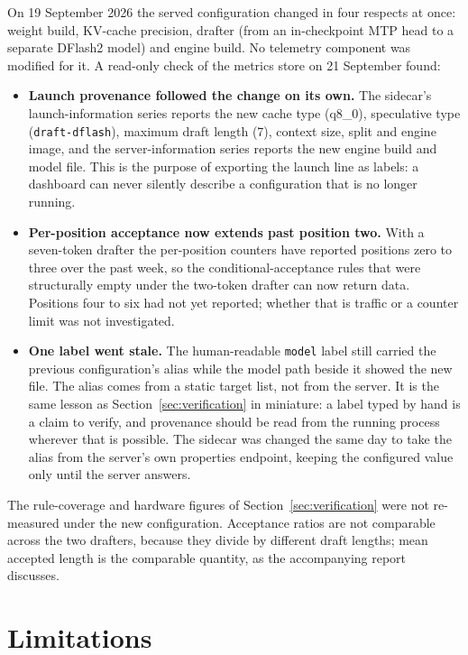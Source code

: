 \documentclass[11pt]{article}
\begin{document}
On 19 September 2026 the served configuration changed in four respects at once: weight build, KV-cache
precision, drafter (from an in-checkpoint MTP head to a separate DFlash2 model) and engine build. No
telemetry component was modified for it. A read-only check of the metrics store on 21 September found:
\begin{itemize}
\item \textbf{Launch provenance followed the change on its own.} The sidecar's launch-information
series reports the new cache type (q8\_0), speculative type (\texttt{draft-dflash}), maximum draft
length (7), context size, split and engine image, and the server-information series reports the new
engine build and model file. This is the purpose of exporting the launch line as labels: a dashboard
can never silently describe a configuration that is no longer running.
\item \textbf{Per-position acceptance now extends past position two.} With a seven-token drafter the
per-position counters have reported positions zero to three over the past week, so the
conditional-acceptance rules that were structurally empty under the two-token drafter can now return
data. Positions four to six had not yet reported; whether that is traffic or a counter limit was not
investigated.
\item \textbf{One label went stale.} The human-readable \texttt{model} label still carried the
previous configuration's alias while the model path beside it showed the new file. The alias comes
from a static target list, not from the server. It is the same lesson as Section~\ref{sec:verification}
in miniature: a label typed by hand is a claim to verify, and provenance should be read from the
running process wherever that is possible. The sidecar was changed the same day to take the
alias from the server's own properties endpoint, keeping the configured value only until the server
answers.
\end{itemize}
The rule-coverage and hardware figures of Section~\ref{sec:verification} were not re-measured under
the new configuration. Acceptance ratios are not comparable across the two drafters, because they
divide by different draft lengths; mean accepted length is the comparable quantity, as the
accompanying report discusses.

\section{Limitations}
\end{document}

